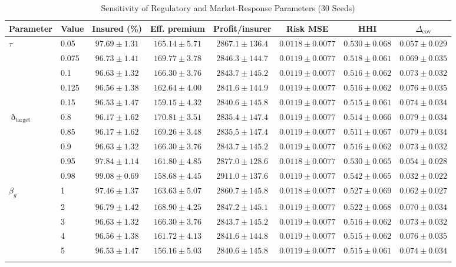 \begin{table}[t]
\centering
\caption{Sensitivity of Regulatory and Market-Response Parameters (30 Seeds)}
\label{tab:sensitivity_regulator}
\scriptsize
\renewcommand{\arraystretch}{1.04}
\setlength{\tabcolsep}{3.2pt}
\begin{tabular}{llcccccc}
\toprule
Parameter & Value & Insured (\%) & Eff. premium & Profit/insurer & Risk MSE & HHI & $\Delta_{\mathrm{cov}}$ \\
\midrule
$\tau$ & 0.05 & $97.69 \pm 1.31$ & $165.14 \pm 5.71$ & $2867.1 \pm 136.4$ & $0.0118 \pm 0.0077$ & $0.530 \pm 0.068$ & $0.057 \pm 0.029$ \\
 & 0.075 & $96.73 \pm 1.41$ & $169.77 \pm 3.78$ & $2846.3 \pm 144.7$ & $0.0119 \pm 0.0077$ & $0.518 \pm 0.061$ & $0.069 \pm 0.035$ \\
 & 0.1 & $96.63 \pm 1.32$ & $166.30 \pm 3.76$ & $2843.7 \pm 145.2$ & $0.0119 \pm 0.0077$ & $0.516 \pm 0.062$ & $0.073 \pm 0.032$ \\
 & 0.125 & $96.56 \pm 1.38$ & $162.64 \pm 4.00$ & $2841.6 \pm 144.9$ & $0.0119 \pm 0.0077$ & $0.516 \pm 0.062$ & $0.076 \pm 0.035$ \\
 & 0.15 & $96.53 \pm 1.47$ & $159.15 \pm 4.32$ & $2840.6 \pm 145.8$ & $0.0119 \pm 0.0077$ & $0.515 \pm 0.061$ & $0.074 \pm 0.034$ \\
\addlinespace
$\eth_{\mathrm{target}}$ & 0.8 & $96.17 \pm 1.62$ & $170.81 \pm 3.51$ & $2835.4 \pm 147.4$ & $0.0119 \pm 0.0077$ & $0.514 \pm 0.066$ & $0.079 \pm 0.034$ \\
 & 0.85 & $96.17 \pm 1.62$ & $169.26 \pm 3.48$ & $2835.5 \pm 147.4$ & $0.0119 \pm 0.0077$ & $0.511 \pm 0.067$ & $0.079 \pm 0.034$ \\
 & 0.9 & $96.63 \pm 1.32$ & $166.30 \pm 3.76$ & $2843.7 \pm 145.2$ & $0.0119 \pm 0.0077$ & $0.516 \pm 0.062$ & $0.073 \pm 0.032$ \\
 & 0.95 & $97.84 \pm 1.14$ & $161.80 \pm 4.85$ & $2877.0 \pm 128.6$ & $0.0118 \pm 0.0077$ & $0.530 \pm 0.065$ & $0.054 \pm 0.028$ \\
 & 0.98 & $99.08 \pm 0.69$ & $158.68 \pm 4.45$ & $2911.0 \pm 137.6$ & $0.0119 \pm 0.0077$ & $0.542 \pm 0.065$ & $0.032 \pm 0.022$ \\
\addlinespace
$\beta_g$ & 1 & $97.46 \pm 1.37$ & $163.63 \pm 5.07$ & $2860.7 \pm 145.8$ & $0.0118 \pm 0.0077$ & $0.527 \pm 0.069$ & $0.062 \pm 0.027$ \\
 & 2 & $96.79 \pm 1.42$ & $168.90 \pm 4.25$ & $2847.2 \pm 145.1$ & $0.0119 \pm 0.0077$ & $0.522 \pm 0.068$ & $0.070 \pm 0.034$ \\
 & 3 & $96.63 \pm 1.32$ & $166.30 \pm 3.76$ & $2843.7 \pm 145.2$ & $0.0119 \pm 0.0077$ & $0.516 \pm 0.062$ & $0.073 \pm 0.032$ \\
 & 4 & $96.56 \pm 1.38$ & $161.72 \pm 4.13$ & $2841.6 \pm 144.8$ & $0.0119 \pm 0.0077$ & $0.515 \pm 0.062$ & $0.076 \pm 0.035$ \\
 & 5 & $96.53 \pm 1.47$ & $156.16 \pm 5.03$ & $2840.6 \pm 145.8$ & $0.0119 \pm 0.0077$ & $0.515 \pm 0.061$ & $0.074 \pm 0.034$ \\
\addlinespace
\bottomrule
\end{tabular}
\end{table}

